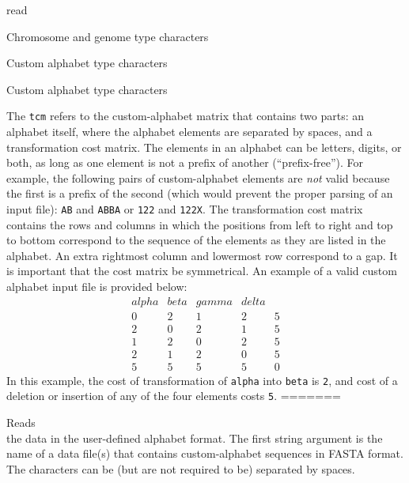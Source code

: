 \begin{command}{read}{}
\begin{arguments}
\begin{argumentgroup}{Chromosome and genome type characters}
\begin{argumentgroup}{Custom alphabet type characters}
\begin{argumentgroup}{Custom alphabet type characters}
{             The \texttt{tcm} refers to the custom-alphabet matrix that contains two parts:
            an alphabet itself, where the alphabet elements are separated by spaces, and a
            transformation cost matrix. The elements in an alphabet can be letters, digits, or
            both, as long as one element is not a prefix of another  (``prefix-free''). For
            example, the following pairs of custom-alphabet elements are \emph{not} valid
            because the first is a prefix of the second (which would prevent the proper parsing of
            an input file): \texttt{AB} and \texttt{ABBA} or \texttt{122} and \texttt{122X}.
            The transformation cost matrix contains the rows and columns in which the
            positions from left to right and top to bottom correspond to the sequence of the
            elements as they are listed in the alphabet. An extra rightmost column and lowermost
            row correspond to a gap. It is important that the cost matrix  be symmetrical. An example 
            of a valid custom alphabet input file is provided below:
       	  \\
	       \begin{equation*}
                \begin{array}{lllll}
                      alpha & beta & gamma & delta &   \\
                    0 &     2 &    1 &     2 &     5 \\
                    2 &     0 &    2 &     1 &     5 \\
                    1 &     2 &    0 &     2 &     5 \\
                    2 &     1 &    2 &     0 &     5 \\
                    5 &     5 &    5 &     5 &     0
                 \end{array}
            \end{equation*} 
           In this example, the cost of transformation of \texttt{alpha} into \texttt{beta} is \texttt{2},
           and cost of a deletion or insertion of any of the four elements costs \texttt{5}.
=======
                {Reads \\ the data in the user-defined alphabet format. The first string argument is
                the name of a data file(s) that contains custom-alphabet sequences in FASTA format. 
                The characters can be (but are not required to be) separated by spaces.
                     
}}
\end{argumentgroup}
\end{argumentgroup}
\end{argumentgroup}
\end{arguments}
\end{command}
